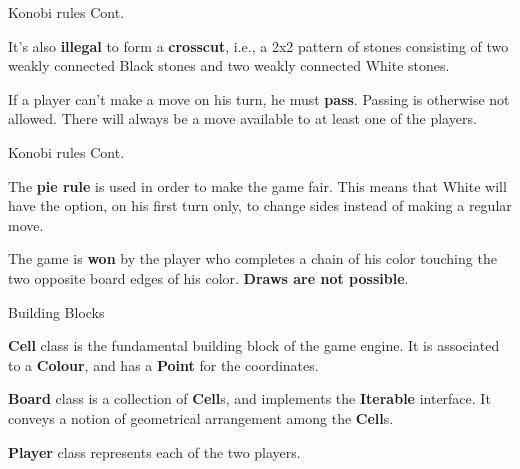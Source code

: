 \documentclass{beamer}
\begin{document}
  \begin{frame}{Konobi rules Cont.}

    It's also \textbf{illegal} to form a \textbf{crosscut}, i.e., a 2x2 pattern of stones consisting of two weakly connected Black stones and two weakly connected White stones.

    \vspace{1em}

    \begin{centering}


    \end{centering}\pause

    \vspace{1em}

    If a player can't make a move on his turn, he must \textbf{pass}. Passing is otherwise not allowed. There will always be a move available to at least one of the players.

  \end{frame}


  \begin{frame}{Konobi rules Cont.}

    The \textbf{pie rule} is used in order to make the game fair. This means that White will have the option, on his first turn only, to change sides instead of making a regular move.\pause

    \vspace{3em}

    The game is \textbf{won} by the player who completes a chain of his color touching the two opposite board edges of his color. \textbf{Draws are not possible}.

  \end{frame}



\begin{frame}{Building Blocks}

\textbf{Cell} class is the fundamental building block of the game engine. It is associated to a \textbf{Colour}, and has a \textbf{Point} for the coordinates.

\vspace{1em}

\textbf{Board} class is a collection of \textbf{Cell}s, and implements the \textbf{Iterable} interface. It conveys a notion of geometrical arrangement among the \textbf{Cell}s.

\vspace{1em}

\textbf{Player} class represents each of the two players.

\end{frame}
\end{document}
